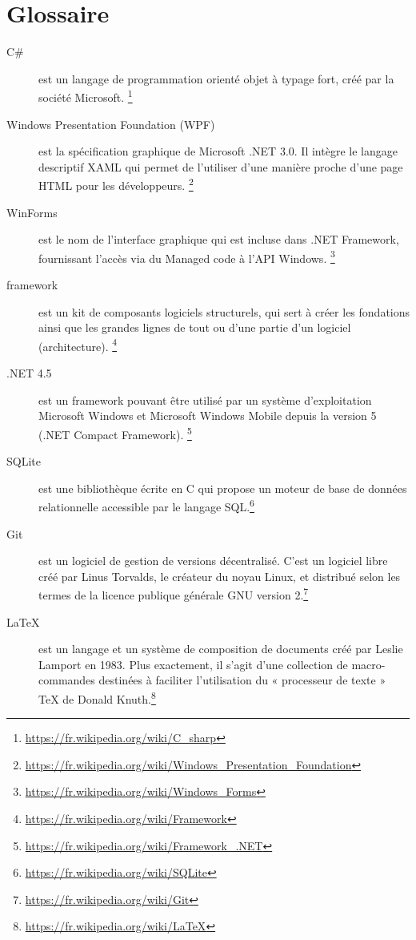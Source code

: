 \documentclass[letterpaper, oneside, 12pt, these, creativecommons]{thETS}
\begin{document}


\tableofcontents
\listoftables
\listoffigures

\chapter{Glossaire}

\begin{description}
\item[C\#] est un langage de programmation orienté objet à typage fort, créé par la société Microsoft. \footnote{\url{https://fr.wikipedia.org/wiki/C_sharp}}
\item[Windows Presentation Foundation (WPF)] est la spécification graphique de Microsoft .NET 3.0. Il intègre le langage descriptif XAML qui permet de l'utiliser d'une manière proche d'une page HTML pour les développeurs. \footnote{\url{https://fr.wikipedia.org/wiki/Windows_Presentation_Foundation}}
\item[WinForms] est le nom de l'interface graphique qui est incluse dans .NET Framework, fournissant l'accès via du Managed code à l'API Windows. \footnote{\url{https://fr.wikipedia.org/wiki/Windows_Forms}}
\item[framework] est un kit de composants logiciels structurels, qui sert à créer les fondations ainsi que les grandes lignes de tout ou d’une partie d'un logiciel (architecture). \footnote{\url{https://fr.wikipedia.org/wiki/Framework}}
\item[.NET 4.5] est un framework pouvant être utilisé par un système d'exploitation Microsoft Windows et Microsoft Windows Mobile depuis la version 5 (.NET Compact Framework). \footnote{\url{https://fr.wikipedia.org/wiki/Framework_.NET}}
\item[SQLite] est une bibliothèque écrite en C qui propose un moteur de base de données relationnelle accessible par le langage SQL.\footnote{\url{https://fr.wikipedia.org/wiki/SQLite}}
\item[Git] est un logiciel de gestion de versions décentralisé. C'est un logiciel libre créé par Linus Torvalds, le créateur du noyau Linux, et distribué selon les termes de la licence publique générale GNU version 2.\footnote{\url{https://fr.wikipedia.org/wiki/Git}}
\item[\LaTeX] est un langage et un système de composition de documents créé par Leslie Lamport en 1983. Plus exactement, il s'agit d'une collection de macro-commandes destinées à faciliter l'utilisation du « processeur de texte » TeX de Donald Knuth.\footnote{\url{https://fr.wikipedia.org/wiki/LaTeX}}
\end{description}
\end{document}
